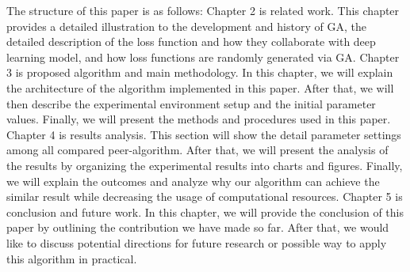 \begin{ZhChapter}
The structure of this paper is as follows: Chapter 2 is related work. This chapter provides a detailed illustration to the development and history of GA, the detailed description of the loss function and how they collaborate with deep learning model, and how loss functions are randomly generated via GA. Chapter 3 is proposed algorithm and main methodology. In this chapter, we will explain the architecture of the algorithm implemented in this paper. After that, we will then describe the experimental environment setup and the initial parameter values. Finally, we will present the methods and procedures used in this paper. Chapter 4 is results analysis. This section will show the detail parameter settings among all compared peer-algorithm. After that, we will present the analysis of the results by organizing the experimental results into charts and figures. Finally, we will explain the outcomes and analyze why our algorithm can achieve the similar result while decreasing the usage of computational resources. Chapter 5 is conclusion and future work. In this chapter, we will provide the conclusion of this paper by outlining the contribution we have made so far. After that, we would like to discuss potential directions for future research or possible way to apply this algorithm in practical.






\end{ZhChapter}

